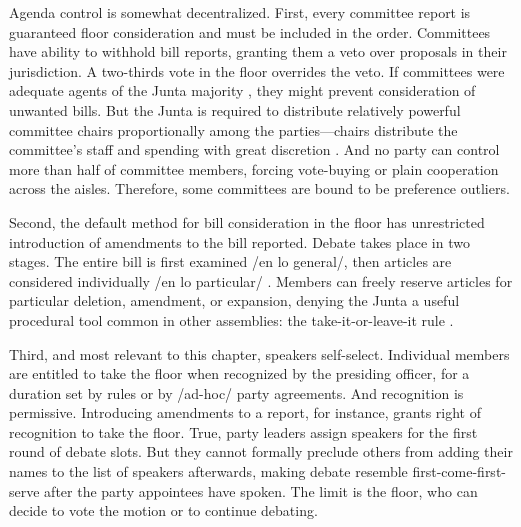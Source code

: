 \documentclass[letter,12pt]{article}
\begin{document}


Agenda control is somewhat decentralized. First, every committee report is guaranteed floor consideration and must be included in the order. Committees have ability to withhold bill reports, granting them a veto over proposals in their jurisdiction. A two-thirds vote in the floor overrides the veto. If committees were adequate agents of the Junta majority \citep[cf.][]{cox.mccubbins.1993}, they might prevent consideration of unwanted bills. But the Junta is required to distribute relatively powerful committee chairs proportionally among the parties---chairs distribute the committee's staff and spending with great discretion \citep{casar.2011}. And no party can control more than half of committee members, forcing vote-buying or plain cooperation across the aisles. Therefore, some committees are bound to be preference outliers.

Second, the default method for bill consideration in the floor has unrestricted introduction of amendments to the bill reported. Debate takes place in two stages. The entire bill is first examined /en lo general/, then articles are considered individually /en lo particular/ \citep[see][]{heller.weldon.nd}. Members can freely reserve articles for particular deletion, amendment, or expansion, denying the Junta a useful procedural tool common in other assemblies: the take-it-or-leave-it rule \citep[eg.,][]{cox.2006,dion.huber.1996}.

Third, and most relevant to this chapter, speakers self-select. Individual members are entitled to take the floor when recognized by the presiding officer, for a duration set by rules or by /ad-hoc/ party agreements. And recognition is permissive. Introducing amendments to a report, for instance, grants right of recognition to take the floor. True, party leaders assign speakers for the first round of debate slots. But they cannot formally preclude others from adding their names to the list of speakers afterwards, making debate resemble first-come-first-serve after the party appointees have spoken. The limit is the floor, who can decide to vote the motion or to continue debating. 
\end{document}
